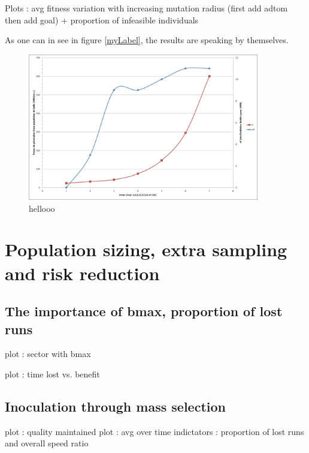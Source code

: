 \documentclass[english]{DESCARWINreport}
\begin{document}
Plots : avg fitness variation with increasing mutation radius (first add adtom then add goal) + proportion of infeasible individuals

As one can in see in figure \ref{myLabel}, the results are speaking by themselves.



\begin{figure}
	\centering
		\includegraphics[width=0.9\textwidth]{pics/bmax.eps}
	\caption{hellooo}
	\label{fig:bmax}
\end{figure}


\chapter{Population sizing, extra sampling and risk reduction}

\section{The importance of bmax, proportion of lost runs}

plot : sector with bmax

plot : time lost vs. benefit

\section{Inoculation through mass selection}

plot : quality maintained
plot : avg over time 
indictators : proportion of lost runs and overall speed ratio
\end{document}
